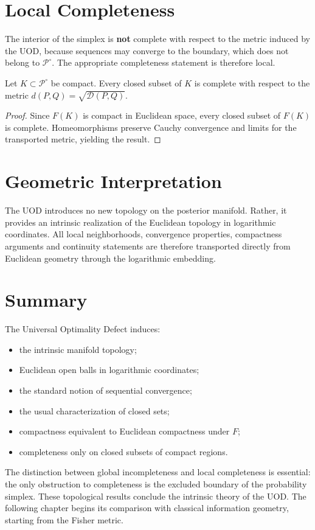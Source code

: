 \section{Local Completeness}
The interior of the simplex is \textbf{not} complete with respect to the
metric induced by the UOD, because sequences may converge to the
boundary, which does not belong to \(\mathcal P^\circ\).
The appropriate completeness statement is therefore local.
\begin{proposition}
\label{ch:prop:24-7}
Let \(K\subset\mathcal P^\circ\) be compact.
Every closed subset of \(K\) is complete with respect to the metric
$d(P,Q)=\sqrt{\mathcal D(P,Q)}.$
\end{proposition}
\begin{proof}
Since \(F(K)\) is compact in Euclidean space, every closed subset of
\(F(K)\) is complete. Homeomorphisms preserve Cauchy convergence and
limits for the transported metric, yielding the result. 
\end{proof}
\section{Geometric Interpretation}
The UOD introduces no new topology on the posterior manifold. Rather, it
provides an intrinsic realization of the Euclidean topology in
logarithmic coordinates.
All local neighborhoods, convergence properties, compactness arguments
and continuity statements are therefore transported directly from
Euclidean geometry through the logarithmic embedding.
\section{Summary}
The Universal Optimality Defect induces:
\begin{itemize}
\item the intrinsic manifold topology;
\item Euclidean open balls in logarithmic coordinates;
\item the standard notion of sequential convergence;
\item the usual characterization of closed sets;
\item compactness equivalent to Euclidean compactness under \(F\);
\item completeness only on closed subsets of compact regions.
\end{itemize}
The distinction between global incompleteness and local completeness is
essential: the only obstruction to completeness is the excluded boundary
of the probability simplex.
These topological results conclude the intrinsic theory of the UOD. The
following chapter begins its comparison with classical information
geometry, starting from the Fisher metric.

